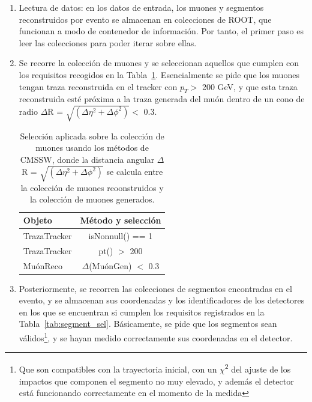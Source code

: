 \begin{enumerate}
\item Lectura de datos: en los datos de entrada, los muones y segmentos reconstruidos por evento se almacenan en colecciones de ROOT, que funcionan a modo de contenedor de informaci\'on. Por tanto, el primer paso es leer las colecciones para poder iterar sobre ellas. 
\item Se recorre la colecci\'on de muones y se seleccionan aquellos que cumplen con los requisitos recogidos en la Tabla~\ref{tab:muon_sel}. Esencialmente se pide que los muones tengan traza reconstruida en el tracker con $p_{T} >$ 200 GeV, y que esta traza reconstruida est\'e pr\'oxima a la traza generada del mu\'on dentro de un cono de radio $\Delta$R = $\sqrt{(\Delta\eta^{2}+\Delta\phi^{2})} <$  0.3.

\begin{table}[htbp]
  \begin{center}
    {\normalsize
      \begin{tabular} {lc}
        \hline
        \hline
        Objeto                            & M\'etodo y selecci\'on                \\
        \hline
        TrazaTracker                      & isNonnull() == 1                       \\
        TrazaTracker                      & pt() $>$ 200                           \\
        Mu\'onReco                        & $\Delta$(Mu\'onGen) $<$ 0.3            \\
        \hline
      \end{tabular}
    }
    \caption{Selecci\'on aplicada sobre la colecci\'on de muones usando los m\'etodos de CMSSW, donde la distancia angular $\Delta$R = $\sqrt{(\Delta\eta^{2}+\Delta\phi^{2})}$ se calcula entre la colecci\'on de muones reoonstruidos y la colecci\'on de muones generados.}
    \label{tab:muon_sel}
  \end{center}
\end{table}

\item Posteriormente, se recorren las colecciones de segmentos encontradas en el evento, y se almacenan sus coordenadas y los identificadores de los detectores en los que se encuentran si cumplen los requisitos registrados en la Tabla~\ref{tab:segment_sel}. B\'asicamente, se pide que los segmentos sean v\'alidos\footnote{Que son compatibles con la trayectoria inicial, con un $\chi$\textsuperscript{2} del ajuste de los impactos que componen el segmento no muy elevado, y adem\'as el detector est\'a funcionando correctamente en el momento de la medida}, y se hayan medido correctamente sus coordenadas en el detector.


\end{enumerate}
